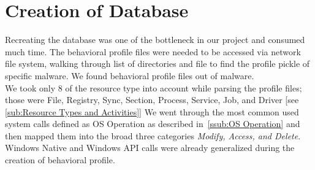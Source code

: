 
\section{Creation of Database}
\label{sec:Creation of Database}
Recreating the database was one of the bottleneck in our project and consumed much time.
The behavioral profile files were needed to be accessed via network file system, walking through list of directories and file to find the profile pickle of specific malware.
We found \emph{\gettotalmalwareii{}} behavioral profile files out of \emph{\gettotalmalwarei{}} malware.\\
We took only 8 of the resource type into account while parsing the profile files; those were File, Registry, Sync, Section, Process, Service, Job, and Driver [see \autoref{sub:Resource Types and Activities}]
We went through the most common used system calls defined as OS Operation as described in~\autoref{ssub:OS Operation} and then mapped them into the broad three categories \emph{Modify, Access, and Delete}.
Windows Native and Windows API calls were already generalized during the creation of behavioral profile.

